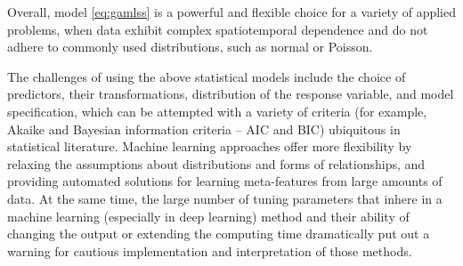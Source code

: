 \documentclass[
]{book}
\begin{document}
Overall, model \eqref{eq:gamlss} is a powerful and flexible choice for a variety of applied problems, when data exhibit complex spatiotemporal dependence and do not adhere to commonly used distributions, such as normal or Poisson.

The challenges of using the above statistical models include the choice of predictors, their transformations, distribution of the response variable, and model specification, which can be attempted with a variety of criteria (for example, Akaike and Bayesian information criteria -- AIC and BIC) ubiquitous in statistical literature. Machine learning approaches offer more flexibility by relaxing the assumptions about distributions and forms of relationships, and providing automated solutions for learning meta-features from large amounts of data. At the same time, the large number of tuning parameters that inhere in a machine learning (especially in deep learning) method and their ability of changing the output or extending the computing time dramatically put out a warning for cautious implementation and interpretation of those methods.

  
\end{document}
